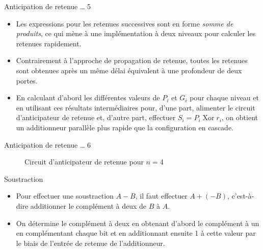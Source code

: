 \documentclass[presentation]{beamer}
\begin{document}
\begin{frame}[label={sec:orgb8d88d4}]{Anticipation de retenue \ldots{} 5}
\begin{itemize}
\item Les expressions pour les retenues successives sont en forme \emph{somme de produits}, ce qui mène à une implémentation à deux niveaux pour calculer les retenues rapidement.

\item Contrairement à l'approche de propagation de retenue, toutes les retenues sont obtenues après un même délai équivalent à une profondeur de deux portes.

\item En calculant d'abord les différentes valeurs de \(P_i\) et \(G_i\) pour chaque niveau et en utilisant ces résultats intermédiaires pour, d'une part, alimenter le circuit d'anticipateur de retenue et, d'autre part, effectuer \(S_i = P_i \operatorname{Xor} r_i\), on obtient un additionneur parallèle plus rapide que la configuration en cascade.
\end{itemize}
\end{frame}

\begin{frame}[label={sec:org4233eb8}]{Anticipation de retenue \ldots{} 6}
\begin{figure}[htbp]
\centering

\caption{\label{fig:orgdd21ef3}Circuit d'anticipateur de retenue pour \(n= 4\)}
\end{figure}
\end{frame}


\begin{frame}[label={sec:orgc4df0a2}]{Soustraction}
\begin{itemize}
\item Pour effectuer une soustraction \(A - B\), il faut effectuer \(A + (-B)\), c'est-à-dire additionner le complément à deux de \(B\) à \(A\).

\item On détermine le complément à deux en obtenant d'abord le complément à un en complémentant chaque bit et en additionnant ensuite 1 à cette valeur par le biais de l'entrée de retenue de l'additionneur.
\end{itemize}
\end{frame}
\end{document}
